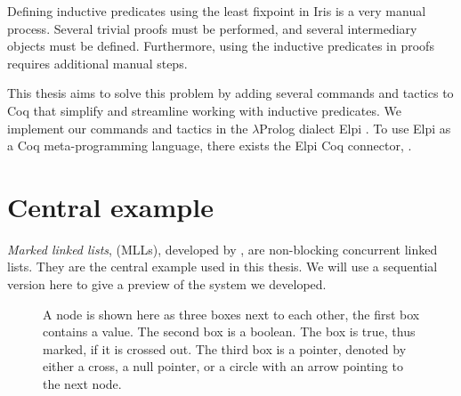 \documentclass[thesis.tex]{subfiles}
\begin{document}
Defining inductive predicates using the least fixpoint in Iris is a very manual process. Several trivial proofs must be performed, and several intermediary objects must be defined. Furthermore, using the inductive predicates in proofs requires additional manual steps.

This thesis aims to solve this problem by adding several commands and tactics to Coq that simplify and streamline working with inductive predicates. We implement our commands and tactics in the $\lambda$Prolog \cite{millerHigherorderLogicProgramming1986,millerUniformProofsFoundation1991,belleanneePragmaticReconstructionLProlog1999,millerProgrammingHigherOrderLogic2012} dialect Elpi \cite{dunchevELPIFastEmbeddable2015,guidiImplementingTypeTheory2019}. To use Elpi as a Coq meta-programming language, there exists the Elpi Coq connector, \ce \cite{tassiElpiExtensionLanguage2018}.

\section{Central example}
\emph{Marked linked lists}, (MLLs), developed by  \cite{harrisPragmaticImplementationNonblocking2001a}, are non-blocking concurrent linked lists. They are the central example used in this thesis. We will use a sequential version here to give a preview of the system we developed.
\begin{figure}[t]
  \centering
  \caption{A node is shown here as three boxes next to each other, the first box contains a value. The second box is a boolean. The box is true, thus marked, if it is crossed out. The third box is a pointer, denoted by either a cross, a null pointer, or a circle with an arrow pointing to the next node.}
  \label{fig:MLLdiag}
\end{figure}
\end{document}
